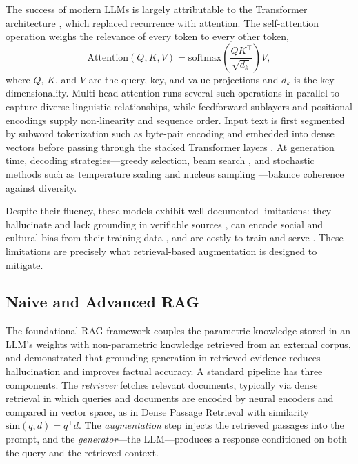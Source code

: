 \documentclass[conference]{IEEEtran}
\begin{document}
The success of modern LLMs is largely attributable to the Transformer architecture \cite{vaswani2017attention}, which replaced recurrence with attention. The self-attention operation weighs the relevance of every token to every other token,
\begin{equation}
\mathrm{Attention}(Q,K,V) = \mathrm{softmax}\!\left(\frac{QK^{\top}}{\sqrt{d_k}}\right) V,
\end{equation}
where $Q$, $K$, and $V$ are the query, key, and value projections and $d_k$ is the key dimensionality. Multi-head attention runs several such operations in parallel to capture diverse linguistic relationships, while feedforward sublayers and positional encodings \cite{shaw2018relative, dufter2022position} supply non-linearity and sequence order. Input text is first segmented by subword tokenization such as byte-pair encoding \cite{sennrich2015bpe} and embedded into dense vectors before passing through the stacked Transformer layers \cite{devlin2018bert, radford2018gpt}. At generation time, decoding strategies---greedy selection, beam search \cite{graves2012sequence}, and stochastic methods such as temperature scaling and nucleus sampling \cite{holtzman2019degeneration}---balance coherence against diversity.

Despite their fluency, these models exhibit well-documented limitations: they hallucinate and lack grounding in verifiable sources \cite{ji2023hallucination}, can encode social and cultural bias from their training data \cite{bender2021parrots}, and are costly to train and serve \cite{strubell2019energy}. These limitations are precisely what retrieval-based augmentation is designed to mitigate.

\subsection{Naive and Advanced RAG}
The foundational RAG framework \cite{lewis2020rag} couples the parametric knowledge stored in an LLM's weights with non-parametric knowledge retrieved from an external corpus, and demonstrated that grounding generation in retrieved evidence reduces hallucination and improves factual accuracy. A standard pipeline has three components. The \emph{retriever} fetches relevant documents, typically via dense retrieval in which queries and documents are encoded by neural encoders \cite{mikolov2013distributed, mikolov2013word2vec, reimers2019sbert} and compared in vector space, as in Dense Passage Retrieval \cite{karpukhin2020dpr} with similarity $\mathrm{sim}(q,d) = q^{\top} d$. The \emph{augmentation} step injects the retrieved passages into the prompt, and the \emph{generator}---the LLM---produces a response conditioned on both the query and the retrieved context.
\end{document}
